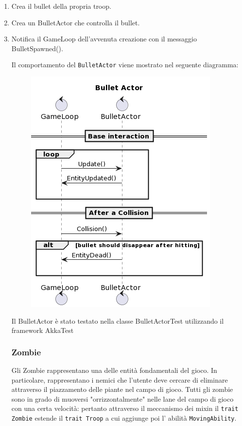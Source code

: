 \begin{enumerate}
    \item Crea il bullet della propria troop.
    \item Crea un BulletActor che controlla il bullet.
    \item Notifica il GameLoop dell'avvenuta creazione con il messaggio BulletSpawned().

    Il comportamento del \texttt{BulletActor} viene mostrato nel seguente diagramma:
    \begin{figure}[H]
        \centering
        \includegraphics[width=\linewidth]{images/bullet-actor.png}
        \label{Diagramma di sequenza del Troop Actor.}
    \end{figure}

    Il BulletActor è stato testato nella classe BulletActorTest utilizzando il framework AkkaTest

    \subsubsection{Zombie}
    Gli Zombie rappresentano una delle entità fondamentali del gioco. In particolare, rappresentano i nemici che l'utente
    deve cercare di eliminare attraverso il piazzamento delle piante nel campo di gioco.
    Tutti gli zombie sono in grado di muoversi "orrizzontalmente" nelle lane del campo di gioco con una certa velocità: pertanto
    attraverso il meccanismo dei mixin il \texttt{trait Zombie} estende il \texttt{trait Troop} a cui aggiunge poi l' abilità \texttt{MovingAbility}.


\end{enumerate}
